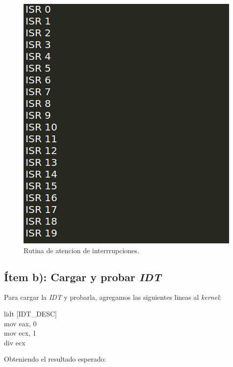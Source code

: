   \begin{figure}[H]
\begin{center}
  \includegraphics[width=\linewidth]{ejercicio2/israsm.png}
  \caption{{\small Rutina de atencion de interrrupciones.} }
\endminipage
\end{center}
\end{figure}


\subsection{Ítem b): Cargar y probar \textit{IDT}}

Para cargar la \textit{IDT} y probarla, agregamos las siguientes lineas al \textit{kernel}:

\begin{center}
    lidt [IDT\_DESC]\\
    mov eax, 0\\
    mov ecx, 1\\
    div ecx$~~~~~$
\end{center}

Obteniendo el resultado esperado:

